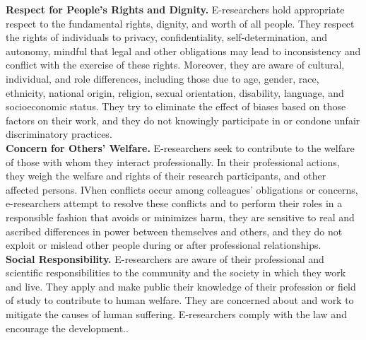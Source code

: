 \documentclass{book}
\begin{document}
\textbf{Respect for People's Rights and Dignity.}  E-researchers hold appropriate respect to the fundamental rights, dignity, and worth of all people. They respect the rights of individuals to privacy, confidentiality, self-determination, and autonomy, mindful that legal and other obligations may lead to inconsistency and conflict with the exercise of these rights. Moreover, they are aware of cultural, individual, and role differences, including those due to age, gender, race, ethnicity, national origin, religion, sexual orientation, disability, language, and socioeconomic status. They try to eliminate the effect of biases based on those factors on their work, and they do not knowingly participate in or condone unfair discriminatory practices.\\
\textbf{Concern for Others' Welfare.} E-researchers seek to contribute to the welfare of those with whom they interact professionally. In their professional actions, they weigh the welfare and rights of their research participants, and other affected persons. IVhen conflicts occur among colleagues' obligations or concerns, e-researchers attempt to resolve these conflicts and to perform their roles in a responsible fashion that avoids or minimizes harm, they are sensitive to real and ascribed differences in power between themselves and others, and they do not exploit or mislead other people during or after professional relationships.\\
\textbf{Social Responsibility.}  E-researchers are aware of their professional and scientific responsibilities to the community and the society in which they work and live. They apply and make public their knowledge of their profession or field of study to contribute to human welfare. They are concerned about and work to mitigate the causes of human suffering. E-researchers comply with the law and encourage the development..
\end{document}
